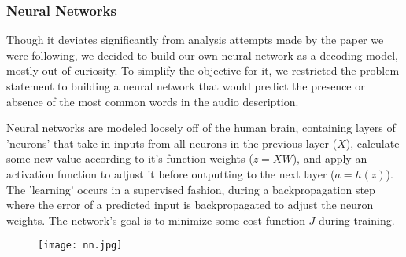 \subsubsection{Neural Networks}
\par Though it deviates significantly from analysis attempts made by the paper we were following, we decided to build our own neural network as a decoding model, mostly out of curiosity. To simplify the objective for it, we restricted the problem statement to building a neural network that would predict the presence or absence of the most common words in the audio description. 

\par Neural networks are modeled loosely off of the human brain, containing layers of 'neurons' that take in inputs from all neurons in the previous layer ($X$), calculate some new value according to it's function weights ($z = XW$), and apply an activation function to adjust it before outputting to the next layer ($a = h(z)$). The 'learning' occurs in a supervised fashion, during a backpropagation step where the error of a predicted input is backpropagated to adjust the neuron weights. The network's goal is to minimize some cost function $J$ during training.

\begin{figure}[H]
  \centering
  \texttt{[image: nn.jpg]}
  \label{fig:test1}
\end{figure}

